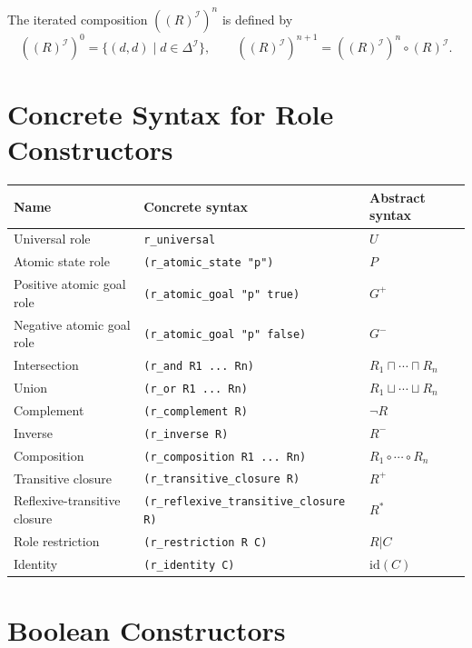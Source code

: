 \documentclass[11pt]{article}
\newcommand{\I}{\mathcal{I}}
\newcommand{\DeltaI}{\Delta^{\I}}
\newcommand{\sem}[1]{\left(#1\right)^{\I}}
\newenvironment{compacttable}
  {\begingroup\setlength{\tabcolsep}{3pt}}
  {\endgroup}
\begin{document}
The iterated composition $(\sem{R})^n$ is defined by
\[
  (\sem{R})^0 = \{(d,d) \mid d\in\DeltaI\},
  \qquad
  (\sem{R})^{n+1} = (\sem{R})^n \circ \sem{R}.
\]

\section{Concrete Syntax for Role Constructors}

\begin{compacttable}
\begin{longtable}{>{\raggedright\arraybackslash}p{}
                  >{\raggedright\arraybackslash}p{}
                  >{\raggedright\arraybackslash}p{}}
\toprule
Name & Concrete syntax & Abstract syntax \\
\midrule
\endhead
Universal role & \texttt{r\_universal} & $U$ \\
Atomic state role & \texttt{(r\_atomic\_state "p")} & $P$ \\
Positive atomic goal role & \texttt{(r\_atomic\_goal "p" true)} & $G^+$ \\
Negative atomic goal role & \texttt{(r\_atomic\_goal "p" false)} & $G^-$ \\
Intersection & \texttt{(r\_and R1 ... Rn)} & $R_1 \sqcap \cdots \sqcap R_n$ \\
Union & \texttt{(r\_or R1 ... Rn)} & $R_1 \sqcup \cdots \sqcup R_n$ \\
Complement & \texttt{(r\_complement R)} & $\neg R$ \\
Inverse & \texttt{(r\_inverse R)} & $R^{-}$ \\
Composition & \texttt{(r\_composition R1 ... Rn)} & $R_1 \circ \cdots \circ R_n$ \\
Transitive closure & \texttt{(r\_transitive\_closure R)} & $R^{+}$ \\
Reflexive-transitive closure & \texttt{(r\_reflexive\_transitive\_closure R)} & $R^{*}$ \\
Role restriction & \texttt{(r\_restriction R C)} & $R|C$ \\
Identity & \texttt{(r\_identity C)} & $\mathrm{id}(C)$ \\
\bottomrule
\end{longtable}
\end{compacttable}

\section{Boolean Constructors}
\end{document}
